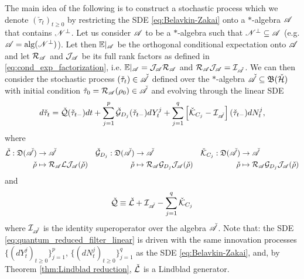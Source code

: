 \documentclass[aihp,12pt]{imsart}
\begin{document}
The main idea of the following is to construct a stochastic process which we denote  $(\check{\tau}_t)_{t\geq0}$ by restricting the SDE \eqref{eq:Belavkin-Zakai} onto a $*$-algebra $\mathscr{A}$ that contains $\mathscr{N}^\perp$.
Let us consider $\mathscr{A}$ to be a $*$-algebra such that $\mathscr{N}^\perp\subseteq\mathscr{A}$ (e.g. $\mathscr{A}={\rm alg}(\mathscr{N}^\perp)$). Let then $\mathbb{E}|_{\mathscr{A}}$ be the orthogonal conditional expectation onto $\mathscr{A}$ and let $\mathcal{R}_{\mathscr{A}}$ and $\mathcal{J}_{\mathscr{A}}$ be its full rank factors as defined in \eqref{eq:cond_exp_factorization}, i.e. $\mathbb{E}|_{\mathscr{A}} = \mathcal{J}_{\mathscr{A}}\mathcal{R}_{\mathscr{A}}$ and $\mathcal{R}_{\mathscr{A}}\mathcal{J}_{\mathscr{A}} = \mathcal{I}_{\check{\mathscr{A}}}$. We can then consider the stochastic process $(\check{\tau}_t)\in\check{\mathscr{A}}$ defined over the $*$-algebra $\check{\mathscr{A}}\subseteq\mathfrak{B}(\check{\mathcal{H}})$ with initial condition $\check{\tau}_0 = \mathcal{R}_{\mathscr{A}}(\rho_0)\in\check{\mathscr{A}}$ and evolving through the linear SDE 
\begin{equation}
    d\check{\tau}_t = \check{\mathcal{Q}}(\check{\tau}_{t-}) dt + \sum_{j=1}^p \check{\mathcal{G}}_{D_j}(\check{\tau}_{t-}) dY_t^j + \sum_{j=1}^q \left[\check{\mathcal{K}}_{C_j}-\mathcal{I}_{\check{\mathscr{A}}}\right](\check{\tau}_{t-}) dN_t^j,
    \label{eq:quantum_reduced_filter_linear}
\end{equation}
where
\begin{align}
\begin{split}
    \check{\mathcal{L}}:\mathfrak{D}(\check{\mathscr{A}})&\to\check{\mathscr{A}}\\
    \check{\rho}&\mapsto 
    \mathcal{R}_{\mathscr{A}} {\mathcal{L}}\mathcal{J}_{\mathscr{A}}(\check{\rho})
\end{split}&&
\begin{split}
    \check{\mathcal{G}}_{D_j}:\mathfrak{D}(\check{\mathscr{A}})&\to\check{\mathscr{A}}\\
    \check{\rho}&\mapsto 
    \mathcal{R}_{\mathscr{A}} {\mathcal{G}}_{D_j}\mathcal{J}_{\mathscr{A}}(\check{\rho})
\end{split}&&
\begin{split}
    \check{\mathcal{K}}_{C_j}:\mathfrak{D}(\check{\mathscr{A}})&\to\check{\mathscr{A}}\\
    \check{\rho}&\mapsto
    \mathcal{R}_{\mathscr{A}} {\mathcal{G}}_{D_j}\mathcal{J}_{\mathscr{A}}(\check{\rho})
\end{split}
\end{align}
and $$\check{\mathcal{Q}} \equiv \check{\mathcal{L}} +\mathcal{I}_{\check{\mathscr{A}}} - \sum_{j=1}^q \check{\mathcal{K}}_{C_j}$$ where $\mathcal{I}_{\check{\mathscr{A}}}$ is the identity superoperator over the algebra $\check{\mathscr{A}}$. Note that: the SDE \eqref{eq:quantum_reduced_filter_linear} is driven with the same innovation processes $\{(dY_t^j)_{t\geq0}\}_{j=1}^p$, $\{(dN_t^j)_{t\geq0}\}_{j=1}^q$ as the SDE \eqref{eq:Belavkin-Zakai}, and, by Theorem \ref{thm:Lindblad reduction}, $\check{\mathcal{L}}$ is a Lindblad generator.
\end{document}
